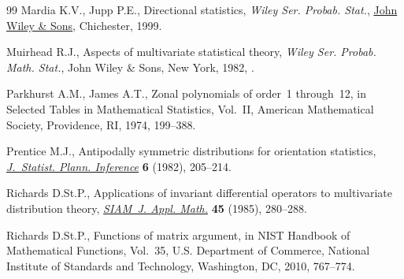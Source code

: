 \documentclass[11pt]{article}
\numberwithin{equation}{section}
\numberwithin{equation}{section}
\begin{document}
\begin{thebibliography}{99}
Mardia K.V., Jupp P.E., Directional statistics, \textit{Wiley Ser. Probab. Stat.}, \href{https://doi.org/10.1002/9780470316979}{John
 Wiley \& Sons}, Chichester, 1999.

Muirhead R.J., Aspects of multivariate statistical theory, \textit{Wiley Ser. Probab. Math. Stat.}, John Wiley \& Sons, New York, 1982,
 .

Parkhurst A.M., James A.T., Zonal polynomials of order~1 through~12, in
 Selected {T}ables in {M}athematical {S}tatistics, {V}ol.~{II}, American
 Mathematical Society, Providence, RI, 1974, 199--388.

Prentice M.J., Antipodally symmetric distributions for orientation statistics,
 \href{https://doi.org/10.1016/0378-3758(82)90025-8}{\textit{J.~Statist. Plann. Inference}} \textbf{6} (1982), 205--214.

Richards D.St.P., Applications of invariant differential operators to
 multivariate distribution theory, \href{https://doi.org/10.1137/0145015}{\textit{SIAM~J. Appl. Math.}} \textbf{45}
 (1985), 280--288.

Richards D.St.P., Functions of matrix argument, in N{IST} {H}andbook of
 {M}athematical {F}unctions, Vol.~35, U.S. Department of Commerce, National
 Institute of Standards and Technology, Washington, DC, 2010, 767--774.

\end{thebibliography}
\end{document}
